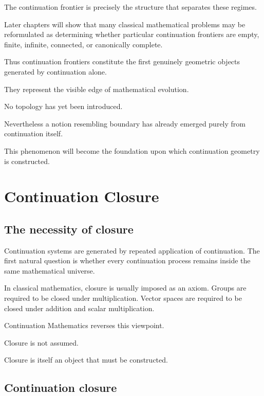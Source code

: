 \documentclass[13pt,openany]{book}
\theoremstyle{plain}
\theoremstyle{definition}
\begin{document}
The continuation frontier is precisely the structure that separates these
regimes.

Later chapters will show that many classical mathematical problems may be
reformulated as determining whether particular continuation frontiers are
empty, finite, infinite, connected, or canonically complete.

Thus continuation frontiers constitute the first genuinely geometric objects
generated by continuation alone.

They represent the visible edge of mathematical evolution.

No topology has yet been introduced.

Nevertheless a notion resembling boundary has already emerged purely from
continuation itself.

This phenomenon will become the foundation upon which continuation geometry is
constructed.

\chapter{Continuation Closure}

\section{The necessity of closure}

Continuation systems are generated by repeated application of continuation.
The first natural question is whether every continuation process remains
inside the same mathematical universe.

In classical mathematics, closure is usually imposed as an axiom.
Groups are required to be closed under multiplication.
Vector spaces are required to be closed under addition and scalar
multiplication.

Continuation Mathematics reverses this viewpoint.

Closure is not assumed.

Closure is itself an object that must be constructed.


\section{Continuation closure}
\end{document}
